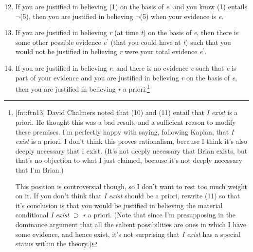 \begin{enumerate}
\setcounter{enumi}{11}
\item
  If you are justified in believing (1) on the basis of \emph{e}, and
  you know (1) entails \(\neg\)(5), then you are justified in believing
  \(\neg\)(5) when your evidence is \emph{e}.
\item
  If you are justified in believing \emph{r} (at time \emph{t}) on the
  basis of \emph{e}, then there is some other possible evidence
  \emph{e}\(^\prime\) (that you could have at \emph{t}) such that you
  would not be justified in believing \emph{r} were your total evidence
  \emph{e}\(^\prime\).
\item
  If you are justified in believing \emph{r}, and there is no evidence
  \emph{e} such that \emph{e} is part of your evidence and you are
  justified in believing \emph{r} on the basis of \emph{e}, then you are
  justified in believing \emph{r} a priori.\footnote{\protect\hypertarget{fnt:ftn13}{}{{[}fnt:ftn13{]}}
    David Chalmers noted that (10) and (11) entail that \emph{I exist}
    is a priori. He thought this was a bad result, and a sufficient
    reason to modify these premises. I'm perfectly happy with saying,
    following Kaplan, that \emph{I exist} is a priori. I don't think
    this proves rationalism, because I think it's also deeply necessary
    that I exist. (It's not deeply necessary that Brian exists, but
    that's no objection to what I just claimed, because it's not deeply
    necessary that I'm Brian.)

    This position is controversial though, so I don't want to rest too
    much weight on it. If you don't think that \emph{I exist} should be
    a priori, rewrite (11) so that it's conclusion is that you would be
    justified in believing the material conditional \emph{I exist}
    \({\supset}\) \emph{r} a priori. (Note that since I'm presupposing
    in the dominance argument that all the salient possibilities are
    ones in which I have some evidence, and hence exist, it's not
    surprising that \emph{I exist} has a special status within the
    theory.)

}
\end{enumerate}
